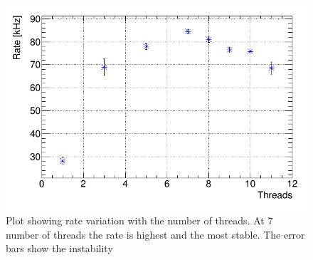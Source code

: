 \begin{figure}[!h]
\centering
\includegraphics[width=0.8\linewidth]{figures/threads_presFive.png}
\caption{Plot showing rate variation with the number of threads. At 7 number of threads the rate is highest and the most stable. The error bars show the instability}
\label{thr_again}
\end{figure}


